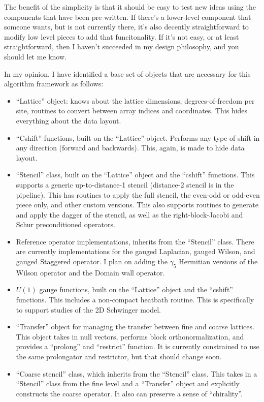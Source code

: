\documentclass[pdftex,letterpaper,10pt]{article}
\begin{document}
The benefit of the simplicity is that it should be easy to test new ideas using the components that have been pre-written. If there's a lower-level component that someone wants, but is not currently there, it's also decently straightforward to modify low level pieces to add that funcitonality. If it's not easy, or at least straightforward, then I haven't succeeded in my design philosophy, and you should let me know.

In my opinion, I have identified a base set of objects that are necessary for this algorithm framework as follows:

\begin{itemize}
\item ``Lattice'' object: knows about the lattice dimensions, degrees-of-freedom per site, routines to convert between array indices and coordinates. This hides everything about the data layout.
\item ``Cshift'' functions, built on the ``Lattice'' object. Performs any type of shift in any direction (forward and backwards). This, again, is made to hide data layout.
\item ``Stencil'' class, built on the ``Lattice'' object and the ``cshift'' functions. This supports a generic up-to-distance-1 stencil (distance-2 stencil is in the pipeline). This has routines to apply the full stencil, the even-odd or odd-even piece only, and other custom versions. This also supports routines to generate and apply the dagger of the stencil, as well as the right-block-Jacobi and Schur preconditioned operators.
\item Reference operator implementations, inherits from the ``Stencil'' class. There are currently implementations for the gauged Laplacian, gauged Wilson, and gauged Staggered operator. I plan on adding the $\gamma_5$ Hermitian versions of the Wilson operator and the Domain wall operator.
\item $U(1)$ gauge functions, built on the ``Lattice'' object and the ``cshift'' functions. This includes a non-compact heatbath routine. This is specifically to support studies of the 2D Schwinger model.
\item ``Transfer'' object for managing the transfer between fine and coarse lattices. This object takes in null vectors, performs block orthonormalization, and provides a ``prolong'' and ``restrict'' function. It is currently constrained to use the same prolongator and restrictor, but that should change soon.
\item ``Coarse stencil'' class, which inherits from the ``Stencil'' class. This takes in a ``Stencil'' class from the fine level and a ``Transfer'' object and explicitly constructs the coarse operator. It also can preserve a sense of ``chirality''. 

\end{itemize}
\end{document}
